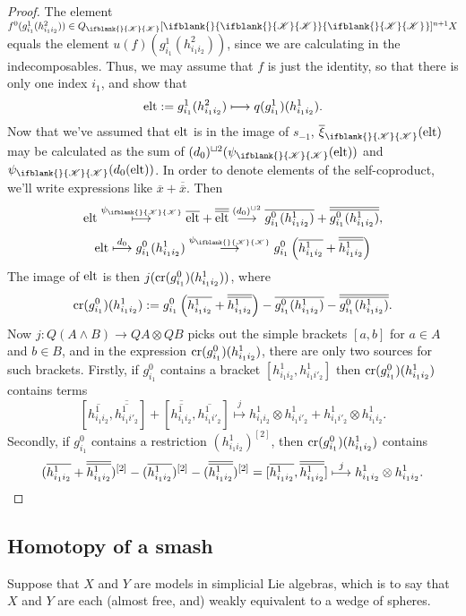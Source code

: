 \documentclass[10pt]{article}
\newcommand{\LL}[1]{\ifblank{#1}{\scrK}{\scrK^{#1}}}
\newcommand{\Fr}[2][]{\ifblank{#1}{#2}{#2_{#1}}}
\renewcommand{\Q}{Q}
\begin{document}
\begin{backgroundOnMultiplicativity}
\begin{proof}
The element $f^0(g^1_{i_1}(h^2_{i_1i_2}))\in \Q_{\LL{}}[\Fr{\LL{}}]^{n+1}X$ equals the element $u(f)(g^1_{i_1}(h^2_{i_1i_2}))$, since we are calculating in the indecomposables. Thus, we may assume that $f$ is just the identity, so that there is only one index $i_1$, and show that
\[\textup{elt}:=g^1_{i_1}(h^2_{i_1i_2})\mapsto q(g^1_{i_1})(h^1_{i_1i_2}).\]
Now that we've assumed that $\textup{elt}$ is in the image of $s_{-1}$, $\overline{\xi}_{\LL{}}(\textup{elt})$ may be calculated as the sum of $(d_0)^{\sqcup 2}(\psi_{\LL{}}(\textup{elt}))$ and $\psi_{\LL{}}(d_0(\textup{elt}))$. In order to denote elements of the self-coproduct, we'll write expressions like $\overline{x}+\overline{\overline{x}}$. Then
\[\textup{elt}\overset{\psi_{\LL{}}}{\mapsto}\overline{\textup{elt}}+\overline{\overline{\textup{elt}}} \overset{(d_0)^{\sqcup 2}}{\to}\overline{g^0_{i_1}(h^1_{i_1i_2})}+ \overline{\overline{g^0_{i_1}(h^1_{i_1i_2})}},\]
\[\textup{elt}\overset{d_0}{\mapsto} g^0_{i_1}(h^1_{i_1i_2})\overset{\psi_{\LL{}}}{\to} g^0_{i_1}\left(\overline{h^1_{i_1i_2}}+ \overline{\overline{h^1_{i_1i_2}}}\right)\]
The image of $\textup{elt}$ is then $j(\textup{cr}(g^0_{i_1})(h^1_{i_1i_2}))$, where
\[\textup{cr}(g^0_{i_1})(h^1_{i_1i_2}):=
g^0_{i_1}\left(\overline{h^1_{i_1i_2}} +\overline{\overline{h^1_{i_1i_2}}}\right)
-\overline{g^0_{i_1}(h^1_{i_1i_2})}- \overline{\overline{g^0_{i_1}(h^1_{i_1i_2})}}.\]
Now $j:Q(A\wedge B)\to QA\otimes QB$ picks out the simple brackets $[a,b]$ for $a\in A$ and $b\in B$, and in the expression $\textup{cr}(g^0_{i_1})(h^1_{i_1i_2})$, there are only two sources for such brackets. Firstly, if $g^0_{i_1}$ contains a bracket $[h^1_{i_1i_2},h^1_{i_1i'_2}]$ then $\textup{cr}(g^0_{i_1})(h^1_{i_1i_2})$ contains terms
\[[\overline{h^1_{i_1i_2}},\overline{\overline{h^1_{i_1i'_2}}}]+[\overline{\overline{h^1_{i_1i_2}}},\overline{h^1_{i_1i'_2}}]\overset{j}{\mapsto}h^1_{i_1i_2}\otimes h^1_{i_1i'_2}+h^1_{i_1i'_2}\otimes h^1_{i_1i_2}.\]
Secondly, if $g^0_{i_1}$ contains a restriction $(h^1_{i_1i_2})^{[2]}$, then $\textup{cr}(g^0_{i_1})(h^1_{i_1i_2})$ contains
\[(\overline{h^1_{i_1i_2}}+\overline{\overline{h^1_{i_1i_2}}})^{[2]}-
(\overline{h^1_{i_1i_2}})^{[2]}
-(\overline{\overline{h^1_{i_1i_2}}})^{[2]}
=[\overline{h^1_{i_1i_2}},\overline{\overline{h^1_{i_1i_2}}}]\overset{j}{\mapsto}h^1_{i_1i_2}\otimes h^1_{i_1i_2}.\qedhere\]
\end{proof}

\subsection{Homotopy of a smash}
Suppose that $X$ and $Y$ are models in simplicial Lie algebras, which is to say that $X$ and $Y$ are each (almost free, and) weakly equivalent to a wedge of spheres. 


\end{backgroundOnMultiplicativity}
\end{document}
